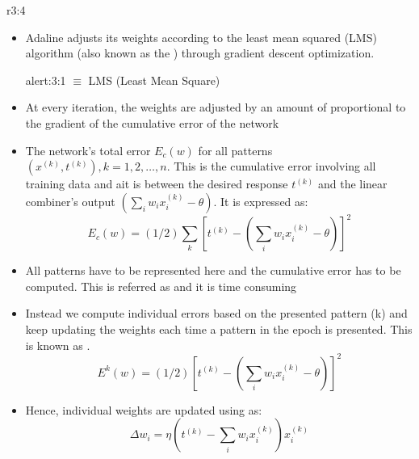\documentclass{tron}
\begin{document}
\begin{remark}{r3:4}
	\begin{itemize}
		\item Adaline adjusts its weights according to the least mean squared (LMS) algorithm (also known as the ) through gradient descent optimization.
		\begin{alert}[LMS]{alert:3:1}
				 $\equiv$ LMS (Least Mean Square)
		\end{alert}
		\item At every iteration, the weights are adjusted by an amount of proportional to the gradient of the cumulative error of the network 
		\item The network's total error $E_c(w)$ for all patterns $(x^{(k)}, t^{(k)}), k = 1, 2, \dots, n$. This is the cumulative error involving all training data and ait is between the desired response $t^{(k)}$ and the linear combiner's output $(\sum_i w_i x_i^{(k)} - \theta)$. It is expressed as:
			\begin{equation}
				E_c(w) = (1/2) \sum_k \left[ t^{(k)} - (\sum_i w_i x_i^{(k)} - \theta)\right]^2
			\end{equation}
		\item All patterns have to be represented here and the cumulative error has to be computed. This is referred as  and it is time consuming
		\item Instead we compute individual errors based on the presented pattern (k) and keep updating the weights each time a pattern in the epoch is presented. This is known as .
			\begin{equation}
				E^k(w) = (1/2) \left[ t^{(k)} - (\sum_i w_i x_i^{(k)} - \theta)\right]^2
			\end{equation}
		\item Hence, individual weights are updated using  as:
			\begin{equation}
				\Delta w_i = \eta \left( t^{(k)} - \sum_i w_i x_i^{(k)} \right) x_i^{(k)}
			\end{equation}
	\end{itemize}
\end{remark}
\end{document}
